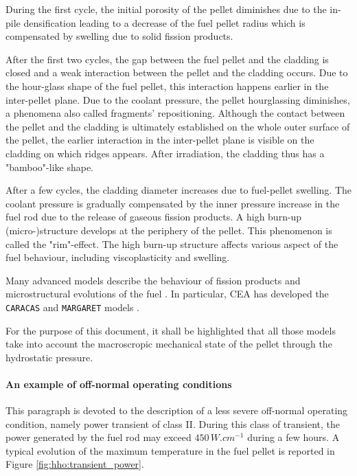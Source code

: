 During the first cycle, the initial porosity of the pellet diminishes due to the
in-pile densification leading to a decrease of the fuel pellet radius
which is compensated by swelling due to solid fission products.

After the first two cycles, the gap between the fuel pellet and the
cladding is closed and a weak interaction between the pellet and the
cladding occurs. Due to the hour-glass shape of the fuel pellet, this
interaction happens earlier in the inter-pellet plane. Due to the coolant
pressure, the pellet hourglassing diminishes, a phenomena also called
fragments' repositioning. Although the contact between the pellet and
the cladding is ultimately established on the whole outer surface of the
pellet, the earlier interaction in the inter-pellet plane is visible on
the cladding on which ridges appears. After irradiation, the cladding
thus has a "bamboo"-like shape.

After a few cycles, the cladding diameter increases due to fuel-pellet
swelling. The coolant pressure is gradually compensated by the inner
pressure increase in the fuel rod due to the release of gaseous fission
products. A high burn-up (micro-)structure develops at the periphery of
the pellet. This phenomenon is called the "rim"-effect. The high burn-up
structure affects various aspect of the fuel behaviour, including
viscoplasticity and swelling.

Many advanced models describe the behaviour of fission products and
microstructural evolutions of the fuel \cite{pizzocri_sciantix_2020}. In
particular, CEA has developed the \texttt{CARACAS} \cite{boulore_approach_2017}
and \texttt{MARGARET} models \cite{noirot_margaret_2011}.

For the purpose of this document, it shall be highlighted that all those
models take into account the macroscropic mechanical state of the pellet
through the hydrostatic pressure.

\paragraph{An example of off-normal operating conditions}
\label{sec:hho:off_normal_operating_conditions}

This paragraph is devoted to the description of a less severe off-normal
operating condition, namely power transient of class II. During this
class of transient, the power generated by the fuel rod may exceed
\(450\,W.cm^{-1}\) during a few hours. A typical evolution of the
maximum temperature in the fuel pellet is reported in Figure
\ref{fig:hho:transient_power}.

